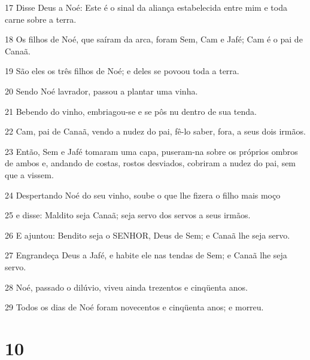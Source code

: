 \par 17 Disse Deus a Noé: Este é o sinal da aliança estabelecida entre mim e toda carne sobre a terra.
\par 18 Os filhos de Noé, que saíram da arca, foram Sem, Cam e Jafé; Cam é o pai de Canaã.
\par 19 São eles os três filhos de Noé; e deles se povoou toda a terra.
\par 20 Sendo Noé lavrador, passou a plantar uma vinha.
\par 21 Bebendo do vinho, embriagou-se e se pôs nu dentro de sua tenda.
\par 22 Cam, pai de Canaã, vendo a nudez do pai, fê-lo saber, fora, a seus dois irmãos.
\par 23 Então, Sem e Jafé tomaram uma capa, puseram-na sobre os próprios ombros de ambos e, andando de costas, rostos desviados, cobriram a nudez do pai, sem que a vissem.
\par 24 Despertando Noé do seu vinho, soube o que lhe fizera o filho mais moço
\par 25 e disse: Maldito seja Canaã; seja servo dos servos a seus irmãos.
\par 26 E ajuntou: Bendito seja o SENHOR, Deus de Sem; e Canaã lhe seja servo.
\par 27 Engrandeça Deus a Jafé, e habite ele nas tendas de Sem; e Canaã lhe seja servo.
\par 28 Noé, passado o dilúvio, viveu ainda trezentos e cinqüenta anos.
\par 29 Todos os dias de Noé foram novecentos e cinqüenta anos; e morreu.

\chapter{10}

